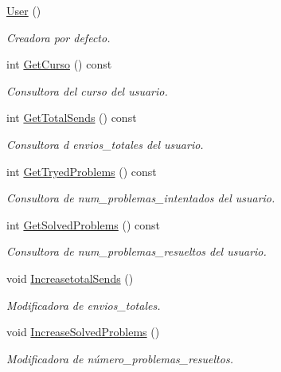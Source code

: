 \begin{DoxyCompactItemize}
\item 
\mbox{\hyperlink{class_user_a4a0137053e591fbb79d9057dd7d2283d}{User}} ()
\begin{DoxyCompactList}\small\item\em Creadora por defecto. \end{DoxyCompactList}\item 
int \mbox{\hyperlink{class_user_a7e91af81476c9ae37cd2bad99862fc8f}{Get\+Curso}} () const
\begin{DoxyCompactList}\small\item\em Consultora del curso del usuario. \end{DoxyCompactList}\item 
int \mbox{\hyperlink{class_user_aa9e61fa20b935204897891e161a75286}{Get\+Total\+Sends}} () const
\begin{DoxyCompactList}\small\item\em Consultora d envios\+\_\+totales del usuario. \end{DoxyCompactList}\item 
int \mbox{\hyperlink{class_user_a8c4799a9a4bfa78fbe289f845deaccb1}{Get\+Tryed\+Problems}} () const
\begin{DoxyCompactList}\small\item\em Consultora de num\+\_\+problemas\+\_\+intentados del usuario. \end{DoxyCompactList}\item 
int \mbox{\hyperlink{class_user_a4dc2fc233119ddda449099634f4d2c46}{Get\+Solved\+Problems}} () const
\begin{DoxyCompactList}\small\item\em Consultora de num\+\_\+problemas\+\_\+resueltos del usuario. \end{DoxyCompactList}\item 
void \mbox{\hyperlink{class_user_a53b7e71fae56e308549a5773c66011f9}{Increasetotal\+Sends}} ()
\begin{DoxyCompactList}\small\item\em Modificadora de envios\+\_\+totales. \end{DoxyCompactList}\item 
void \mbox{\hyperlink{class_user_a287307b6e024775e5a570949c09d7043}{Increase\+Solved\+Problems}} ()
\begin{DoxyCompactList}\small\item\em Modificadora de número\+\_\+problemas\+\_\+resueltos. \end{DoxyCompactList}\item 

\end{DoxyCompactItemize}
